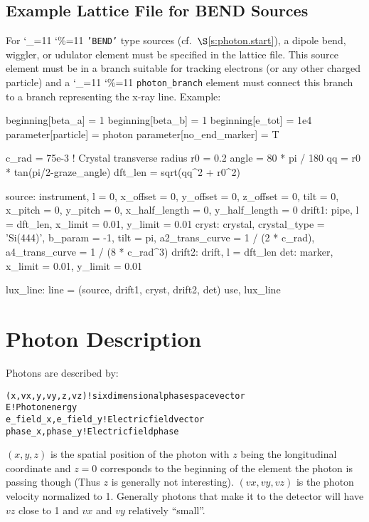\documentclass[11pt]{article}
\newcommand\ttcmd{\begingroup\catcode`\_=11 \catcode`\%=11 \dottcmd}
\newcommand\dottcmd[1]{\texttt{#1}\endgroup}
\newcommand{\vn}{\ttcmd}
\newcommand{\sref}[1]{$\S$\ref{#1}}
\newenvironment{example}
  {\vspace{\ExBeg} \begin{alltt}}
  {\end{alltt} \vspace{\ExEnd}}
\newlength{\ExBeg}
\newlength{\ExEnd}
\begin{document}
\subsection{Example Lattice File for BEND Sources}
\label{s:bend.lat}

For \vn{'BEND'} type sources (cf.~\sref{s:photon.start}), a dipole
bend, wiggler, or udulator element must be specified in the lattice
file. This source element must be in a branch suitable for tracking
electrons (or any other charged particle) and a \vn{photon_branch}
element must connect this branch to a branch representing the x-ray
line. Example:
\begin{listing}{1}

beginning[beta_a] = 1
beginning[beta_b] = 1
beginning[e_tot] = 1e4
parameter[particle] = photon
parameter[no_end_marker] = T

c_rad = 75e-3  ! Crystal transverse radius 
r0 = 0.2
angle  = 80 * pi / 180
qq = r0 * tan(pi/2-graze_angle)
dft_len = sqrt(qq^2 + r0^2)

source: instrument, l = 0, x_offset = 0, y_offset = 0, z_offset = 0, tilt = 0,
        x_pitch = 0, y_pitch = 0, x_half_length = 0, y_half_length = 0
drift1: pipe, l = dft_len, x_limit = 0.01, y_limit = 0.01
cryst: crystal, crystal_type = 'Si(444)', b_param = -1, tilt = pi, 
        a2_trans_curve = 1 / (2 * c_rad), a4_trans_curve = 1 / (8 * c_rad^3)
drift2: drift, l = dft_len
det: marker, x_limit = 0.01, y_limit = 0.01

lux_line: line = (source, drift1, cryst, drift2, det)
use, lux_line
\end{listing}

\section{Photon Description}
\label{s:photon.descrip}

Photons are described by:
\begin{example}
  (x, vx, y, vy, z, vz)   ! six dimensional phase space vector 
  E                       ! Photon energy 
  e_field_x, e_field_y    ! Electric field vector
  phase_x, phase_y        ! Electric field phase 
\end{example}
$(x, y, z)$ is the spatial position of the photon with $z$ being the
longitudinal coordinate and $z=0$ corresponds to the beginning of the
element the photon is passing though (Thus $z$ is generally not
interesting). $(vx, vy, vz)$ is the photon velocity normalized to 1.
Generally photons that make it to the detector will have $vz$ close to
1 and $vx$ and $vy$ relatively ``small''.
\end{document}
